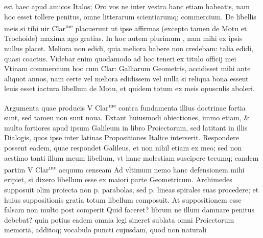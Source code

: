 \documentclass[11pt,a4paper]{article}
\begin{document}
est haec apud amicos Italos; Oro vos ne inter vestra hanc etiam habeatis, nam hoc esset tollere penitus, omne litterarum scientiarumq; commercium. De libellis meis si tibi uir Clar\textsuperscript{me} placuerunt ut ipse affirmas (excepto tamen de Motu et Trochoide) maxima ago gratias. In hoc autem plurimum , nam mihi ex ipsis nullus placet. Meliora non edidi, quia meliora habere non credebam: talia edidi, quasi coactus. Videbar enim quodamodo ad hoc teneri ex titulo officij mei Vtinam commercium hoc cum Clar: Galliarum Geometris, accidisset mihi ante aliquot annos, nam certe vel meliora edidissem vel nulla si reliqua bona essent leuis esset iactura libellum de Motu, et quidem totum ex meis opusculis aboleri.

Argumenta quae producis V Clar\textsuperscript{me} contra fundamenta illius doctrinae fortia sunt, sed tamen non sunt noua. Extant huiusmodi obiectiones, immo etiam, \& multo fortiores apud ipsum Galileum in libro Proiectorum, sed latitant in illis Dialogis, quos ipse inter latinas Propositiones Italice interserit. Respondere possent eadem, quae respondet Galileus, et non nihil etiam ex meo; sed non aestimo tanti illum meum libellum, vt hanc molestiam suscipere tecumq; eandem partim V Clar\textsuperscript{me} aequum censeam Ad vltimum nemo hanc defensionem mihi eripiet, si dixero libellum esse ex maiori parte Geometricum. Archimedes supposuit olim proiecta non p. parabolas, sed p. lineas spirales suas procedere; et huius suppositionis gratia totum libellum composuit. At suppositionem esse falsam non multo post comperit Quid faceret? librum ne illum damnare penitus debebat? quin potius eadem omnia legi sineret sublata omni Proiectorum memoriä, additoq; vocabulo puncti cujusdam, quod non naturali

\end{document}
